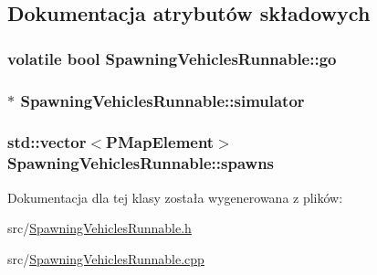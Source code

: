 \subsection{Dokumentacja atrybutów składowych}
\hypertarget{class_spawning_vehicles_runnable_ab868348a67a2995fc163b2155bfccb66}{
\subsubsection[{go}]{\setlength{\rightskip}{0pt plus 5cm}volatile bool Spawning\-Vehicles\-Runnable\-::go\hspace{0.3cm}{\ttfamily [private]}}}\label{class_spawning_vehicles_runnable_ab868348a67a2995fc163b2155bfccb66}
\hypertarget{class_spawning_vehicles_runnable_a42bd4b9c441492b4206941856e140e3f}{
\subsubsection[{simulator}]{$\ast$ Spawning\-Vehicles\-Runnable\-::simulator\hspace{0.3cm}{\ttfamily [private]}}}\label{class_spawning_vehicles_runnable_a42bd4b9c441492b4206941856e140e3f}
\hypertarget{class_spawning_vehicles_runnable_a1a9c575abd9e800d8b95a429b70be951}{
\subsubsection[{spawns}]{\setlength{\rightskip}{0pt plus 5cm}std\-::vector$<${\bf P\-Map\-Element}$>$ Spawning\-Vehicles\-Runnable\-::spawns\hspace{0.3cm}{\ttfamily [private]}}}\label{class_spawning_vehicles_runnable_a1a9c575abd9e800d8b95a429b70be951}


Dokumentacja dla tej klasy została wygenerowana z plików\-:\begin{DoxyCompactItemize}
\item 
src/\hyperlink{_spawning_vehicles_runnable_8h}{Spawning\-Vehicles\-Runnable.\-h}\item 
src/\hyperlink{_spawning_vehicles_runnable_8cpp}{Spawning\-Vehicles\-Runnable.\-cpp}\end{DoxyCompactItemize}
